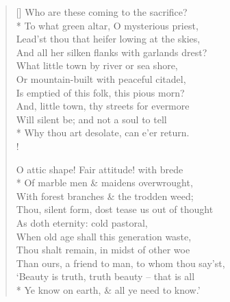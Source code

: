 \begin{verse}[\versewidth]
Who are these coming to the sacrifice?\\*
\vin To what green altar, O mysterious priest,\\
Lead'st thou that heifer lowing at the skies,\\
\vin And all her silken flanks with garlands drest?\\
What little town by river or sea shore,\\
\vin Or mountain-built with peaceful citadel,\\
\vin \vin Is emptied of this folk, this pious morn?\\
And, little town, thy streets for evermore\\
\vin Will silent be; and not a soul to tell\\*
\vin \vin Why thou art desolate, can e'er return.\\!

O attic shape! Fair attitude! with brede\\*
\vin Of marble men \& maidens overwrought,\\
With forest branches \& the trodden weed;\\
\vin Thou, silent form, dost tease us out of thought\\
As doth eternity: cold pastoral,\\
\vin When old age shall this generation waste,\\
\vin \vin Thou shalt remain, in midst of other woe\\
Than ours, a friend to man, to whom thou say'st,\\
\vin `Beauty is truth, truth beauty -- that is all\\*
\vin \vin Ye know on earth, \& all ye need to know.'
\end{verse}
